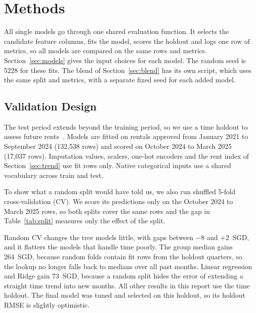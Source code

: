\section{Methods}\label{sec:methods}

All single models go through one shared evaluation function. It selects the candidate feature columns, fits the model, scores the holdout and logs one row of metrics, so all models are compared on the same rows and metrics. Section~\ref{sec:models} gives the input choices for each model. The random seed is 5228 for these fits. The blend of Section~\ref{sec:blend} has its own script, which uses the same split and metrics, with a separate fixed seed for each added model.

\subsection{Validation Design}\label{sec:validation}

The test period extends beyond the training period, so we use a time holdout to assess future rents~\cite{hyndman2021forecasting,bergmeir2012use}. Models are fitted on rentals approved from January 2021 to September 2024 (132{,}538 rows) and scored on October 2024 to March 2025 (17{,}037 rows). Imputation values, scalers, one-hot encoders and the rent index of Section~\ref{sec:trend} use fit rows only. Native categorical inputs use a shared vocabulary across train and test.

To show what a random split would have told us, we also run shuffled 5-fold cross-validation (CV). We score its predictions only on the October 2024 to March 2025 rows, so both splits cover the same rows and the gap in Table~\ref{tab:split} measures only the effect of the split.

\begin{table}[htbp]
\caption{RMSE (SGD) on the October 2024 to March 2025 rows under the time holdout and under random 5-fold CV. Gap is time minus random.}
\label{tab:split}
\centering
\footnotesize

\end{table}

Random CV changes the tree models little, with gaps between $-8$ and $+2$~SGD, and it flatters the models that handle time poorly. The group median gains 264~SGD, because random folds contain fit rows from the holdout quarters, so the lookup no longer falls back to medians over all past months. Linear regression and Ridge gain 73~SGD, because a random split hides the error of extending a straight time trend into new months. All other results in this report use the time holdout. The final model was tuned and selected on this holdout, so its holdout RMSE is slightly optimistic.

